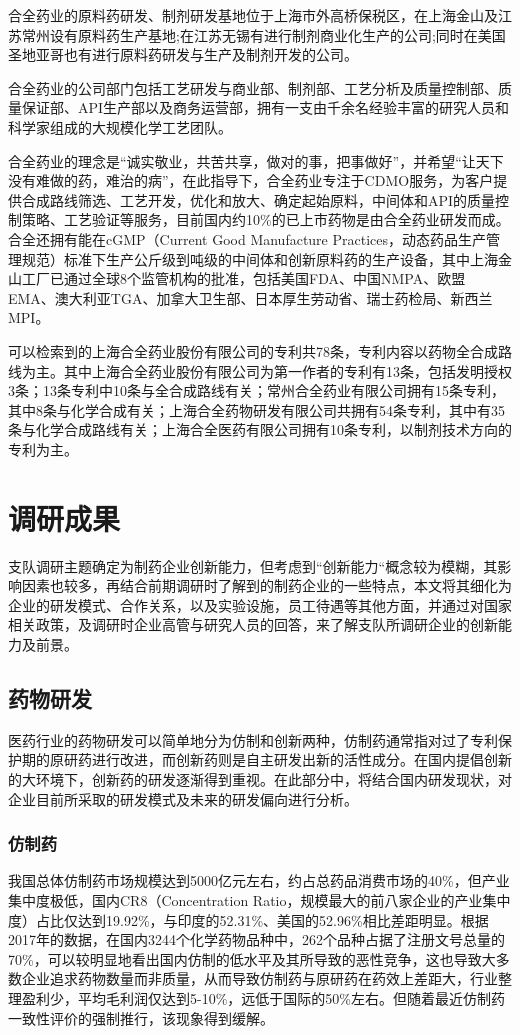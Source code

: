 \documentclass[twocolumn,openany]{ctexbook}
\begin{document}
	合全药业的原料药研发、制剂研发基地位于上海市外高桥保税区，在上海金山及江苏常州设有原料药生产基地;在江苏无锡有进行制剂商业化生产的公司;同时在美国圣地亚哥也有进行原料药研发与生产及制剂开发的公司\citep{RN37}。
		
		合全药业的公司部门包括工艺研发与商业部、制剂部、工艺分析及质量控制部、质量保证部、API生产部以及商务运营部，拥有一支由千余名经验丰富的研究人员和科学家组成的大规模化学工艺团队\citep{RN36}。
		
		合全药业的理念是“诚实敬业，共苦共享，做对的事，把事做好”，并希望“让天下没有难做的药，难治的病”，在此指导下，合全药业专注于CDMO服务，为客户提供合成路线筛选、工艺开发，优化和放大、确定起始原料，中间体和API的质量控制策略、工艺验证等服务，目前国内约10\%的已上市药物是由合全药业研发而成。合全还拥有能在cGMP（Current Good Manufacture Practices，动态药品生产管理规范）标准下生产公斤级到吨级的中间体和创新原料药的生产设备，其中上海金山工厂已通过全球8个监管机构的批准，包括美国FDA、中国NMPA、欧盟EMA、澳大利亚TGA、加拿大卫生部、日本厚生劳动省、瑞士药检局、新西兰MPI。
		
		可以检索到的上海合全药业股份有限公司的专利共78条，专利内容以药物全合成路线为主。其中上海合全药业股份有限公司为第一作者的专利有13条，包括发明授权3条；13条专利中10条与全合成路线有关；常州合全药业有限公司拥有15条专利，其中8条与化学合成有关；上海合全药物研发有限公司共拥有54条专利，其中有35条与化学合成路线有关；上海合全医药有限公司拥有10条专利，以制剂技术方向的专利为主。
		
	\chapter{调研成果}
	支队调研主题确定为制药企业创新能力，但考虑到“创新能力“概念较为模糊，其影响因素也较多，再结合前期调研时了解到的制药企业的一些特点，本文将其细化为企业的研发模式、合作关系，以及实验设施，员工待遇等其他方面，并通过对国家相关政策，及调研时企业高管与研究人员的回答，来了解支队所调研企业的创新能力及前景。
		\section{药物研发}
	医药行业的药物研发可以简单地分为仿制和创新两种，仿制药通常指对过了专利保护期的原研药进行改进，而创新药则是自主研发出新的活性成分。在国内提倡创新的大环境下，创新药的研发逐渐得到重视。在此部分中，将结合国内研发现状，对企业目前所采取的研发模式及未来的研发偏向进行分析。
				
			\subsection{仿制药}
			我国总体仿制药市场规模达到5000亿元左右，约占总药品消费市场的40\%，但产业集中度极低，国内CR8（Concentration Ratio，规模最大的前八家企业的产业集中度）占比仅达到19.92\%，与印度的52.31\%、美国的52.96\%相比差距明显。根据2017年的数据，在国内3244个化学药物品种中，262个品种占据了注册文号总量的70\%，可以较明显地看出国内仿制的低水平及其所导致的恶性竞争，这也导致大多数企业追求药物数量而非质量，从而导致仿制药与原研药在药效上差距大，行业整理盈利少，平均毛利润仅达到5-10\%，远低于国际的50\%左右\citep{RN21}。但随着最近仿制药一致性评价的强制推行，该现象得到缓解。
			
\end{document}

